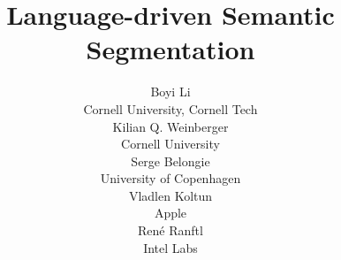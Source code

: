 \documentclass{article} %
\title{Language-driven Semantic Segmentation}
\author{Boyi Li\\
Cornell University, Cornell Tech \\
\And
Kilian Q. Weinberger \\
Cornell University \\
\And
Serge Belongie \\
University of Copenhagen \\
\And
Vladlen Koltun \\
Apple \\
\And
Ren\'e Ranftl \\
Intel Labs \\
}
\begin{document}
\maketitle

\begin{abstract}

\end{abstract}







\clearpage


{\small


}
\end{document}
